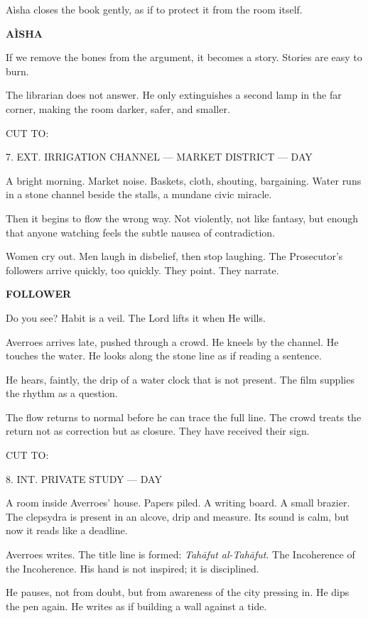 \documentclass[12pt]{article}
\newlength{\charindent}
\newlength{\dialogueindent}
\newlength{\dialoguewidth}
\newlength{\transitionindent}
\newcommand{\slug}[1]{\vspace{1.25em}\textsc{#1}\vspace{0.5em}}
\newcommand{\action}[1]{#1}
\newcommand{\character}[1]{%
  \par\vspace{0.75em}%
  \hspace*{\charindent}\textbf{#1}%
}
\newcommand{\dialogue}[1]{%
  \par\nobreak
  \hspace*{\dialogueindent}%
  \begin{minipage}[t]{\dialoguewidth}
  #1
  \end{minipage}
}
\newcommand{\transition}[1]{%
  \par\vspace{1em}%
  \hspace*{\transitionindent}\textsc{#1}%
}
\begin{document}
\action{A\`isha closes the book gently, as if to protect it from the room itself.}

\character{A\`ISHA}
\dialogue{If we remove the bones from the argument, it becomes a story. Stories are easy to burn.}

\action{The librarian does not answer. He only extinguishes a second lamp in the far corner, making the room darker, safer, and smaller.}

\transition{CUT TO:}

\slug{7. EXT. IRRIGATION CHANNEL --- MARKET DISTRICT --- DAY}

\action{A bright morning. Market noise. Baskets, cloth, shouting, bargaining. Water runs in a stone channel beside the stalls, a mundane civic miracle.}

\action{Then it begins to flow the wrong way. Not violently, not like fantasy, but enough that anyone watching feels the subtle nausea of contradiction.}

\action{Women cry out. Men laugh in disbelief, then stop laughing. The Prosecutor's followers arrive quickly, too quickly. They point. They narrate.}

\character{FOLLOWER}
\dialogue{Do you see? Habit is a veil. The Lord lifts it when He wills.}

\action{Averroes arrives late, pushed through a crowd. He kneels by the channel. He touches the water. He looks along the stone line as if reading a sentence.}

\action{He hears, faintly, the drip of a water clock that is not present. The film supplies the rhythm as a question.}

\action{The flow returns to normal before he can trace the full line. The crowd treats the return not as correction but as closure. They have received their sign.}

\transition{CUT TO:}

\slug{8. INT. PRIVATE STUDY --- DAY}

\action{A room inside Averroes' house. Papers piled. A writing board. A small brazier. The clepsydra is present in an alcove, drip and measure. Its sound is calm, but now it reads like a deadline.}

\action{Averroes writes. The title line is formed: \emph{Tah\={a}fut al-Tah\={a}fut}. The Incoherence of the Incoherence. His hand is not inspired; it is disciplined.}

\action{He pauses, not from doubt, but from awareness of the city pressing in. He dips the pen again. He writes as if building a wall against a tide.}
\end{document}

